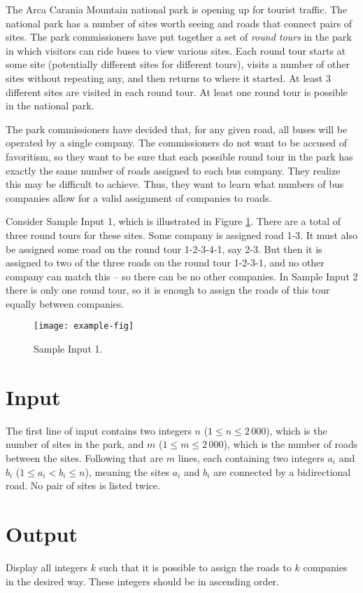 
The Arca Carania Mountain national park is opening up for tourist traffic.
The national park has a number of sites worth seeing and
roads that connect pairs of sites. The park commissioners have put together a set of \textit{round tours} in the park in which visitors can ride buses to view various sites.  Each
round tour starts at some
site (potentially different sites for different tours), visits a number of other sites without repeating any, and then returns to
where it started.  At least 3 different sites are visited in each round tour.
At least one round tour is possible in the national park.

The park commissioners have decided that, for any given road, all buses will be
operated by a single company.  The commissioners do not want to be accused of favoritism, so
they want to be sure that each possible round tour in the park has
exactly the same number of roads assigned to each bus company.
They realize this may be difficult to achieve.  Thus, they want to learn what
numbers of bus companies allow for a valid assignment of companies to roads.

Consider Sample Input 1, which is illustrated in Figure \ref{fig:tours}.  There are a total of three round tours for these sites. Some company is assigned road 1-3.
It must also be assigned some road on the round tour 1-2-3-4-1, say 2-3.  But
then it is assigned to two of the three roads on the round tour 1-2-3-1, and no
other company can match this -- so there can be no other companies.  In Sample
Input 2 there is only one round tour, so it is enough to assign the roads of
this tour equally between companies.

\begin{figure}[!h]
	\centering
    \texttt{[image: example-fig]}
	\caption{Sample Input 1.}
	\label{fig:tours}
\end{figure}

\section*{Input}
The first line of input contains two
integers $n$ ($1 \le n \le 2\,000$), which is the number of sites in the park, and
$m$ ($1 \le m \le 2\,000$), which is the number of roads between the sites.  Following that are
$m$ lines, each containing two integers $a_i$ and $b_i$
($1 \leq a_i < b_i \leq n$), meaning the sites $a_i$ and $b_i$ are connected
by a bidirectional road.  No pair of sites is listed twice.

\section*{Output}
Display all integers $k$ such that it is possible to assign the roads to $k$ companies in the desired way.  These integers should be in ascending order.
